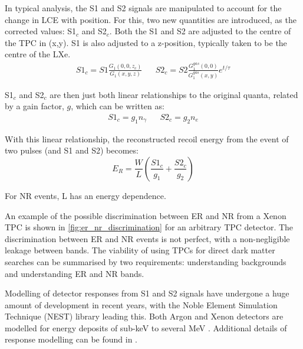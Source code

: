\par
In typical analysis, the S1 and S2 signals are manipulated to account for the change in LCE with position.
For this, two new quantities are introduced, as the corrected values: S1$_c$ and S2$_c$.
Both the S1 and S2 are adjusted to the centre of the TPC in (x,y).
S1 is also adjusted to a z-position, typically taken to be the centre of the LXe.
\begin{align}
    S1_c = S1 \frac{G_1(0,0,z_c)}{G_1(x,y,z)} && S2_c = S2 \frac{G_1^{gas}(0,0)}{G_1^{gas}(x,y)} e^{t/\tau}
    \label{eq:s1c_and_s2c_full}
\end{align}

\par
S1$_c$ and S2$_c$ are then just both linear relationships to the original quanta, related by a gain factor, $g$, which can be written as:
\begin{align}
    S1_c = g_1 n_\gamma && S2_c = g_2 n_e
\end{align}

\par
With this linear relationship, the reconstructed recoil energy from the event of two pulses (and S1 and S2) becomes:
\begin{equation}
    E_R = \frac{W}{L}(\frac{S1_c}{g_1} + \frac{S2_c}{g_2})
\end{equation}

For NR events, L has an energy dependence.
\par
An example of the possible discrimination between ER and NR from a Xenon TPC is shown in \autoref{fig:er_nr_discrimination} for an arbitrary TPC detector.
The discrimination between ER and NR events is not perfect, with a non-negligible leakage between bands.
The viability of using TPCs for direct dark matter searches can be summarised by two requirements: understanding backgrounds and understanding ER and NR bands.



\par
Modelling of detector responses from S1 and S2 signals have undergone a huge amount of development in recent years, with the Noble Element Simulation Technique (NEST) library leading this.
Both Argon and Xenon detectors are modelled for energy deposits of sub-keV to several MeV \cite{nest_1_ref}.
Additional details of response modelling can be found in \cite{gregrischbieter_thesis_ref, flamenest_ref}.
